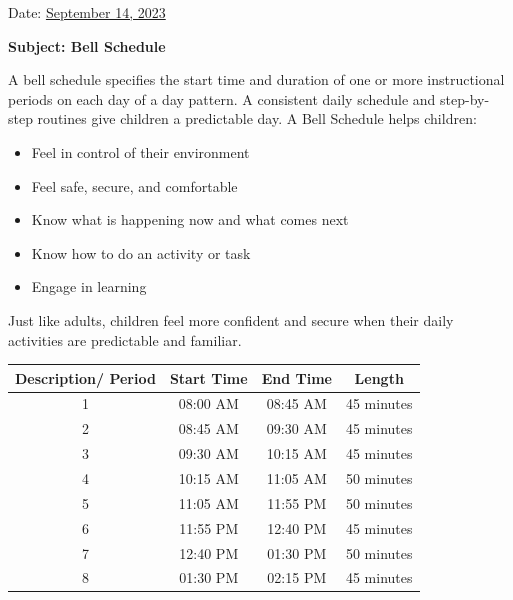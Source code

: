 \documentclass[12pt,letterpaper]{article}
\begin{document}
\vspace*{0.5in}
Date: \href{https://www.ps192.org/apps/bbmessages/show_bbm.jsp?REC_ID=139439}{September 14, 2023} 

\textbf{Subject: Bell Schedule}

A bell schedule specifies the start time and duration of one or more instructional periods on each day of a day pattern. A consistent daily schedule and step-by-step
routines give children a predictable day. A Bell Schedule helps children:
\begin{itemize}
\item Feel in control of their environment
\item Feel safe, secure, and comfortable
\item Know what is happening now and what comes next
\item Know how to do an activity or task
\item Engage in learning
\end{itemize}
Just like adults, children feel more confident and secure when their daily activities are predictable and familiar.

\begin{center}
\LARGE
    \begin{tabular}{|c|c|c|c|}
    \hline
    \textbf{Description/ Period} & \textbf{Start Time} & \textbf{End Time} & 
    \textbf{Length} \\
    
    \hline
    1 & 08:00 AM & 08:45 AM & 45 minutes \\
    \hline
    2 & 08:45 AM & 09:30 AM & 45 minutes \\
    \hline
    3 & 09:30 AM & 10:15 AM & 45 minutes \\
    \hline
    4 & 10:15 AM & 11:05 AM & 50 minutes \\
    \hline
    5 & 11:05 AM & 11:55 PM & 50 minutes \\
    \hline
    6 & 11:55 PM & 12:40 PM & 45 minutes \\
    \hline
    7 & 12:40 PM & 01:30 PM & 50 minutes \\
    \hline
    8 & 01:30 PM & 02:15 PM & 45 minutes \\
    \hline
    \end{tabular}
    \end{center}
\end{document}
